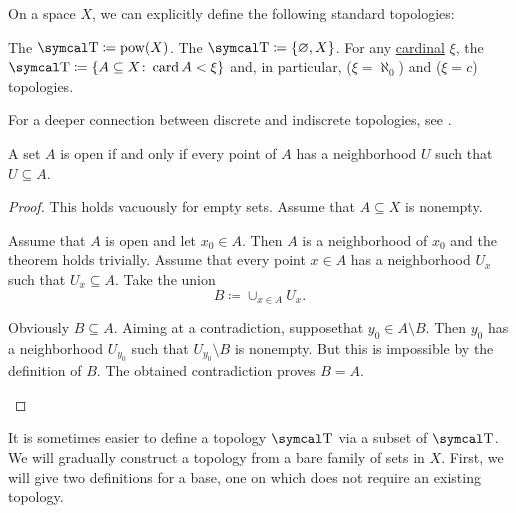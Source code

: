 \begin{definition}\label{def:standard_topologies}
  On a space \( X \), we can explicitly define the following standard topologies:
  \begin{defenum}
     The  \( \CT \coloneqq \Pow(X) \).
     The  \( \CT \coloneqq \{ \varnothing, X \} \).
     For any \hyperref[def:cardinal]{cardinal} \( \xi \), the  \( \CT \coloneqq \{ A \subseteq X \colon \Card A < \xi \} \) and, in particular,  (\( \xi = \aleph_0 \)) and  (\( \xi = c \)) topologies.
  \end{defenum}

  For a deeper connection between discrete and indiscrete topologies, see .
\end{definition}

\begin{proposition}\label{thm:set_open_iff_neighborhood_is_contained}
  A set \( A \) is open if and only if every point of \( A \) has a neighborhood \( U \) such that \( U \subseteq A \).
\end{proposition}
\begin{proof}
  This holds vacuously for empty sets. Assume that \( A \subseteq X \) is nonempty.

  \begin{description}
    \Implies Assume that \( A \) is open and let \( x_0 \in A \). Then \( A \) is a neighborhood of \( x_0 \) and the theorem holds trivially.
    \ImpliedBy Assume that every point \( x \in A \) has a neighborhood \( U_x \) such that \( U_x \subseteq A \). Take the union
    \begin{equation*}
      B \coloneqq \cup_{x \in A} U_x.
    \end{equation*}

    Obviously \( B \subseteq A \). Aiming at a contradiction, suppose\LEM that \( y_0 \in A \setminus B \). Then \( y_0 \) has a neighborhood \( U_{y_0} \) such that \( U_{y_0} \setminus B \) is nonempty. But this is impossible by the definition of \( B \). The obtained contradiction proves \( B = A \).
  \end{description}
\end{proof}

\begin{remark}\label{remark:abritrary_family_to_topology}
  It is sometimes easier to define a topology \( \CT \) via a subset of \( \CT \). We will gradually construct a topology from a bare family of sets in \( X \). First, we will give two definitions for a base, one on which does not require an existing topology.
\end{remark}

